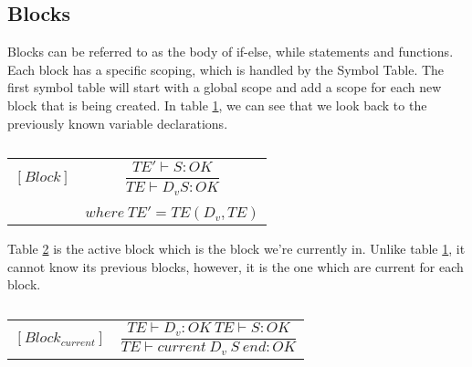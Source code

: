 \subsection{Blocks}
Blocks can be referred to as the body of if-else, while statements and functions. Each block has a specific scoping, which is handled by the Symbol Table. The first symbol table will start with a global scope and add a scope for each new block that is being created. In table \ref{block}, we can see that we look back to the previously known variable declarations.
\begin{table}[H]
    \begin{center}
    \begin{longtable}[c] { r c }
        $[Block]$ 
        & 
        \( \dfrac{TE' \vdash S : OK} 
        {TE \vdash D_v S : OK} \) 
        \\ \\
        & 
        \( {where \ TE' = TE(D_v, TE)} \)
    \end{longtable}
    \caption{}\label{block}
        \end{center}
\end{table}

Table \ref{active-block} is the active block which is the block we’re currently in. Unlike table \ref{block}, it cannot know its previous blocks, however, it is the one which are current for each block.
\begin{table}[H]
    \begin{center}
    \begin{longtable}[c] { r c }
        $[Block_{current}]$ 
        & 
        \( \dfrac{TE \vdash D_{v} : OK \ TE \vdash S : OK} 
        {TE \vdash current \ D_{v} \ S \ end  :  OK} \)
    \end{longtable}
    \caption{}\label{active-block}
        \end{center}
\end{table}
